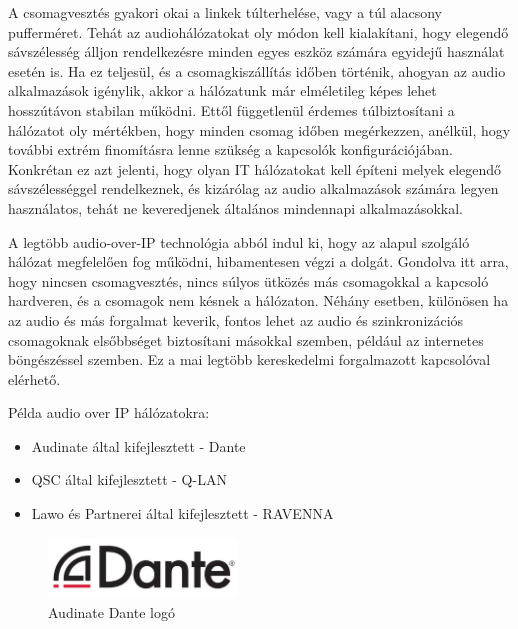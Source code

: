 A csomagvesztés gyakori okai a linkek túlterhelése, vagy a túl alacsony pufferméret.
Tehát az audiohálózatokat oly módon kell kialakítani, hogy elegendő sávszélesség álljon rendelkezésre
minden egyes eszköz számára egyidejű használat esetén is. 
Ha ez teljesül, és a csomagkiszállítás időben történik, ahogyan az audio alkalmazások igénylik,
akkor a hálózatunk már elméletileg képes lehet hosszútávon stabilan működni.
Ettől függetlenül érdemes túlbiztosítani a hálózatot oly mértékben, hogy minden csomag időben
megérkezzen, anélkül, hogy további extrém finomításra lenne szükség a kapcsolók
konfigurációjában. Konkrétan ez azt jelenti, hogy olyan IT hálózatokat kell
építeni melyek elegendő sávszélességgel rendelkeznek, és kizárólag az audio alkalmazások számára
legyen használatos, tehát ne keveredjenek általános mindennapi alkalmazásokkal.

A legtöbb audio-over-IP technológia abból indul ki, hogy az alapul szolgáló
hálózat megfelelően fog működni, hibamentesen végzi a dolgát. Gondolva itt arra, hogy nincsen csomagvesztés, 
nincs súlyos ütközés más csomagokkal a kapcsoló hardveren, és a csomagok nem késnek a hálózaton.
Néhány esetben, különösen ha az audio és más forgalmat keverik, 
fontos lehet az audio és szinkronizációs csomagoknak elsőbbséget biztosítani másokkal szemben,
például az internetes böngészéssel szemben. Ez a mai legtöbb kereskedelmi forgalmazott
kapcsolóval elérhető. \newline

Példa audio over IP hálózatokra:
\begin{itemize}
	\item Audinate által kifejlesztett - Dante
\end{itemize}
\begin{itemize}
	\item QSC által kifejlesztett - Q-LAN
\end{itemize}
\begin{itemize}
	\item Lawo és Partnerei által kifejlesztett - RAVENNA
\end{itemize}
\begin{figure}[H]
	\centering
	\includegraphics[width=50mm, keepaspectratio]{figures/dante_logo.jpg}
	\caption{Audinate Dante logó}
	\label {fig:dante_logo}
\end{figure}
